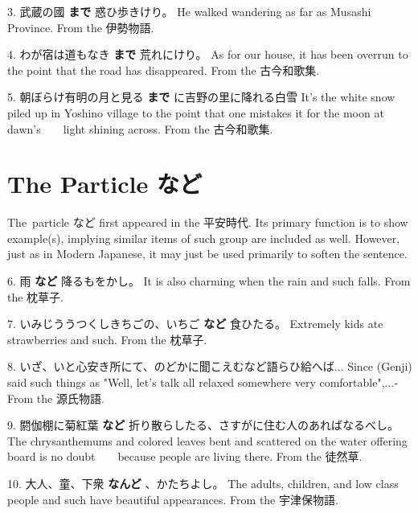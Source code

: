 \par{3. 武蔵の國 \textbf{まで }惑ひ歩きけり。 \hfill\break
He walked wandering as far as Musashi Province. \hfill\break
From the 伊勢物語. }

\par{4. わが宿は道もなき \textbf{まで }荒れにけり。 \hfill\break
As for our house, it has been overrun to the point that the road has disappeared. \hfill\break
From the 古今和歌集. }

\par{5. 朝ぼらけ有明の月と見る \textbf{まで }に吉野の里に降れる白雪 \hfill\break
It's the white snow piled up in Yoshino village to the point that one mistakes it for the moon at dawn's     light shining across. \hfill\break
From the 古今和歌集. }
      
\section{The Particle など}
 
\par{ The particle など first appeared in the 平安時代. Its primary function is to show example(s), implying similar items of such group are included as well. However, just as in Modern Japanese, it may just be used primarily to soften the sentence. }

\par{6. 雨 \textbf{など }降るもをかし。 \hfill\break
It is also charming when the rain and such falls. \hfill\break
From the 枕草子. }

\par{7. いみじううつくしきちごの、いちご \textbf{など }食ひたる。 \hfill\break
Extremely kids ate strawberries and such. \hfill\break
From the 枕草子. }

\par{8. いざ、いと心安き所にて、のどかに聞こえむなど語らひ給へば\dothyp{}\dothyp{}\dothyp{} \hfill\break
Since (Genji) said such things as "Well, let's talk all relaxed somewhere very comfortable",\dothyp{}\dothyp{}\dothyp{} \hfill\break
From the 源氏物語. }

\par{9. 閼伽棚に菊紅葉 \textbf{など }折り散らしたる、さすがに住む人のあればなるべし。 \hfill\break
The chrysanthemums and colored leaves bent and scattered on the water offering board is no doubt     because people are living there. \hfill\break
From the 徒然草. }

\par{10. 大人、童、下衆 \textbf{なんど }、かたちよし。 \hfill\break
The adults, children, and low class people and such have beautiful appearances. \hfill\break
From the 宇津保物語. }

